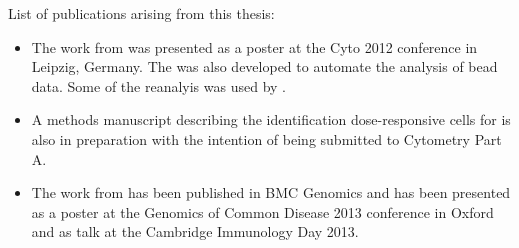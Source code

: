 \begin{publications}


List of publications arising from this thesis:

\begin{itemize}
 \item
   The work from  was presented as a poster at the Cyto 2012 conference in Leipzig, Germany.
   The  was also developed to automate the analysis of bead data.
   Some of the reanalyis was used by .
 \item
   A methods manuscript describing the identification dose-responsive cells for  is also in preparation with the intention of being submitted to Cytometry Part A.
 \item
   The work from  has been published in BMC Genomics \citet{Pontikos:2014ho} and has been presented as a poster
   at the Genomics of Common Disease 2013 conference in Oxford and as talk at the Cambridge Immunology Day 2013.
\end{itemize}

\end{publications}


